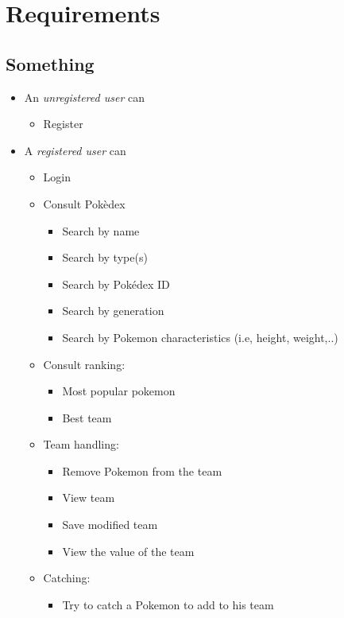 \chapter{Requirements}
\section{Something}
\begin{itemize}
    \item An \textit{unregistered user} can
    \begin{itemize}
        \item Register
    \end{itemize}
    \item A \textit{registered user} can
    \begin{itemize}
        \item Login
        \item Consult Pokèdex
        \begin{itemize}
            \item Search by name
            \item Search by type(s)
            \item Search by Pokédex ID
            \item Search by generation  
            \item Search by Pokemon characteristics (i.e, height, weight,..)	
        \end{itemize}
        \item Consult ranking:
        \begin{itemize}
            \item Most popular pokemon
            \item Best team
        \end{itemize}
        \item Team handling:
        \begin{itemize}
            \item Remove Pokemon from the team
            \item View team
            \item Save modified team
            \item View the value of the team
        \end{itemize}
        \item Catching:
        \begin{itemize}
            \item Try to catch a Pokemon to add to his team
        \end{itemize}

\end{itemize}
\end{itemize}
